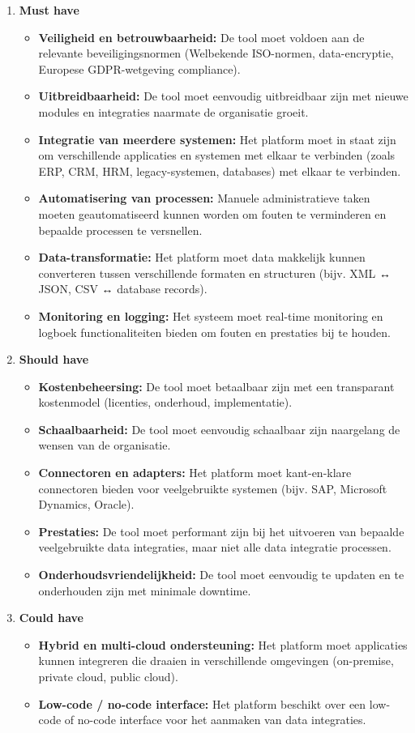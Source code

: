 \begin{enumerate}
    \item \textbf{Must have}
    \begin{itemize}
        \item \textbf{Veiligheid en betrouwbaarheid:} De tool moet voldoen aan de relevante beveiligingsnormen (Welbekende ISO-normen, data-encryptie, Europese GDPR-wetgeving compliance).
        \item \textbf{Uitbreidbaarheid:} De tool moet eenvoudig uitbreidbaar zijn met nieuwe modules en integraties naarmate de organisatie groeit.
        \item \textbf{Integratie van meerdere systemen:} Het platform moet in staat zijn om verschillende applicaties en systemen met elkaar te verbinden (zoals ERP, CRM, HRM, legacy-systemen, databases) met elkaar te verbinden.
        \item \textbf{Automatisering van processen:} Manuele administratieve taken moeten geautomatiseerd kunnen worden om fouten te verminderen en bepaalde processen te versnellen.
        \item \textbf{Data-transformatie:} Het platform moet data makkelijk kunnen converteren tussen verschillende formaten en structuren (bijv. XML ↔ JSON, CSV ↔ database records).
        \item \textbf{Monitoring en logging:} Het systeem moet real-time monitoring en logboek functionaliteiten bieden om fouten en prestaties bij te houden.
    \end{itemize}
    \item \textbf{Should have}
    \begin{itemize}
        \item \textbf{Kostenbeheersing:} De tool moet betaalbaar zijn met een transparant kostenmodel (licenties, onderhoud, implementatie).
        \item \textbf{Schaalbaarheid:} De tool moet eenvoudig schaalbaar zijn naargelang de wensen van de organisatie.
        \item \textbf{Connectoren en adapters:} Het platform moet kant-en-klare connectoren bieden voor veelgebruikte systemen (bijv. SAP, Microsoft Dynamics, Oracle).
        \item \textbf{Prestaties:} De tool moet performant zijn bij het uitvoeren van bepaalde veelgebruikte data integraties, maar niet alle data integratie processen.
        \item \textbf{Onderhoudsvriendelijkheid:} De tool moet eenvoudig te updaten en te onderhouden zijn met minimale downtime.
    \end{itemize}
    \item \textbf{Could have}
    \begin{itemize}
        \item \textbf{Hybrid en multi-cloud ondersteuning:} Het platform moet applicaties kunnen integreren die draaien in verschillende omgevingen (on-premise, private cloud, public cloud).
        \item \textbf{Low-code / no-code interface:} Het platform beschikt over een low-code of no-code interface voor het aanmaken van data integraties.
        

\end{itemize}
\end{enumerate}
